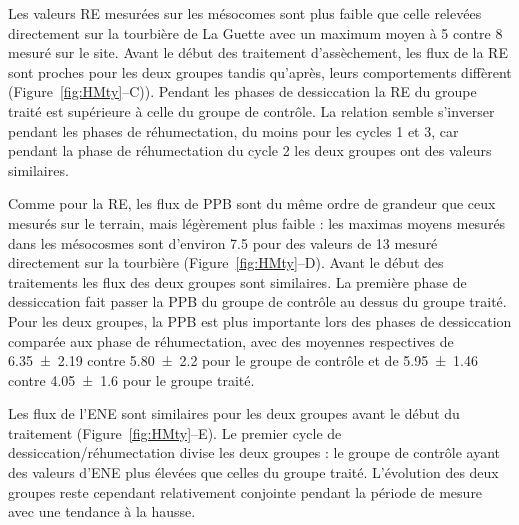 Les valeurs RE mesurées sur les mésocomes sont plus faible que celle relevées directement sur la tourbière de La Guette avec un maximum moyen à 5 contre \SI{8}{\uml} mesuré sur le site.
Avant le début des traitement d'assèchement, les flux de la RE sont proches pour les deux groupes tandis qu'après, leurs comportements diffèrent (Figure~\ref{fig:HMty}--C)).
Pendant les phases de dessiccation la RE du groupe traité est supérieure à celle du groupe de contrôle.
La relation semble s'inverser pendant les phases de réhumectation, du moins pour les cycles 1 et 3, car pendant la phase de réhumectation du cycle 2 les deux groupes ont des valeurs similaires.


Comme pour la RE, les flux de PPB sont du même ordre de grandeur que ceux mesurés sur le terrain, mais légèrement plus faible : les maximas moyens mesurés dans les mésocosmes sont d'environ \num{7.5} pour des valeurs de \SI{13}{\uml} mesuré directement sur la tourbière (Figure~\ref{fig:HMty}--D).
Avant le début des traitements les flux des deux groupes sont similaires.
La première phase de dessiccation fait passer la PPB du groupe de contrôle au dessus du groupe traité.
Pour les deux groupes, la PPB est plus importante lors des phases de dessiccation comparée aux phase de réhumectation, avec des moyennes respectives de \num{6.35(219)} contre \num{5.80(220)} pour le groupe de contrôle et de \num{5.95(146)} contre \SI{4.05(160)}{\uml} pour le groupe traité.

Les flux de l'ENE sont similaires pour les deux groupes avant le début du traitement (Figure~\ref{fig:HMty}--E).
Le premier cycle de dessiccation/réhumectation divise les deux groupes : le groupe de contrôle ayant des valeurs d'ENE plus élevées que celles du groupe traité.
L'évolution des deux groupes reste cependant relativement conjointe pendant la période de mesure avec une tendance à la hausse.

%
%
%

